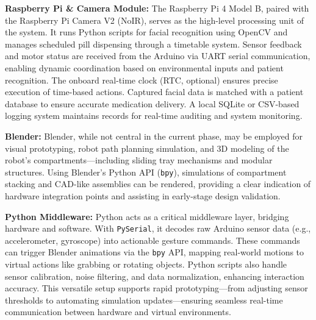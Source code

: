 \textbf{Raspberry Pi \& Camera Module:} The Raspberry Pi 4 Model B, paired with the Raspberry Pi Camera V2 (NoIR), serves as the high-level processing unit of the system. It runs Python scripts for facial recognition using OpenCV and manages scheduled pill dispensing through a timetable system. Sensor feedback and motor status are received from the Arduino via UART serial communication, enabling dynamic coordination based on environmental inputs and patient recognition. The onboard real-time clock (RTC, optional) ensures precise execution of time-based actions. Captured facial data is matched with a patient database to ensure accurate medication delivery. A local SQLite or CSV-based logging system maintains records for real-time auditing and system monitoring.

\vspace{0.5em}

\textbf{Blender:} Blender, while not central in the current phase, may be employed for visual prototyping, robot path planning simulation, and 3D modeling of the robot’s compartments—including sliding tray mechanisms and modular structures. Using Blender’s Python API (\texttt{bpy}), simulations of compartment stacking and CAD-like assemblies can be rendered, providing a clear indication of hardware integration points and assisting in early-stage design validation.

\vspace{0.5em}

\textbf{Python Middleware:} Python acts as a critical middleware layer, bridging hardware and software. With \texttt{PySerial}, it decodes raw Arduino sensor data (e.g., accelerometer, gyroscope) into actionable gesture commands. These commands can trigger Blender animations via the \texttt{bpy} API, mapping real-world motions to virtual actions like grabbing or rotating objects. Python scripts also handle sensor calibration, noise filtering, and data normalization, enhancing interaction accuracy. This versatile setup supports rapid prototyping—from adjusting sensor thresholds to automating simulation updates—ensuring seamless real-time communication between hardware and virtual environments.



